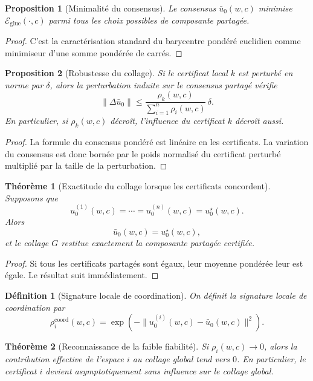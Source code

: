 \documentclass[11pt,a4paper]{article}
\newtheorem{definition}{Définition}[section]
\newtheorem{proposition}{Proposition}[section]
\newtheorem{theorem}{Théorème}[section]
\newcommand{\1}{\mathbf 1}
\begin{document}
\begin{proposition}[Minimalité du consensus]
Le consensus \(\bar u_0(w,c)\) minimise \(\mathcal E_{\mathrm{glue}}(\cdot,c)\) parmi tous les choix possibles de composante partagée.
\end{proposition}

\begin{proof}
C'est la caractérisation standard du barycentre pondéré euclidien comme minimiseur d'une somme pondérée de carrés.
\end{proof}

\begin{proposition}[Robustesse du collage]
Si le certificat local \(k\) est perturbé en norme par \(\delta\), alors la perturbation induite sur le consensus partagé vérifie
\[
\|\Delta \bar u_0\|
\le
\frac{\rho_k(w,c)}{\sum_{i=1}^n \rho_i(w,c)}\,\delta.
\]
En particulier, si \(\rho_k(w,c)\) décroît, l'influence du certificat \(k\) décroît aussi.
\end{proposition}

\begin{proof}
La formule du consensus pondéré est linéaire en les certificats.  
La variation du consensus est donc bornée par le poids normalisé du certificat perturbé multiplié par la taille de la perturbation.
\end{proof}

\begin{theorem}[Exactitude du collage lorsque les certificats concordent]
Supposons que
\[
u_0^{(1)}(w,c)=\cdots=u_0^{(n)}(w,c)=u_0^\star(w,c).
\]
Alors
\[
\bar u_0(w,c)=u_0^\star(w,c),
\]
et le collage \(G\) restitue exactement la composante partagée certifiée.
\end{theorem}

\begin{proof}
Si tous les certificats partagés sont égaux, leur moyenne pondérée leur est égale.  
Le résultat suit immédiatement.
\end{proof}

\begin{definition}[Signature locale de coordination]
On définit la signature locale de coordination par
\[
\rho_i^{\mathrm{coord}}(w,c)
=
\exp\!\left(-\|u_0^{(i)}(w,c)-\bar u_0(w,c)\|^2\right).
\]
\end{definition}

\begin{theorem}[Reconnaissance de la faible fiabilité]
Si \(\rho_i(w,c)\to 0\), alors la contribution effective de l'espace \(i\) au collage global tend vers \(0\).  
En particulier, le certificat \(i\) devient asymptotiquement sans influence sur le collage global.
\end{theorem}
\end{document}
